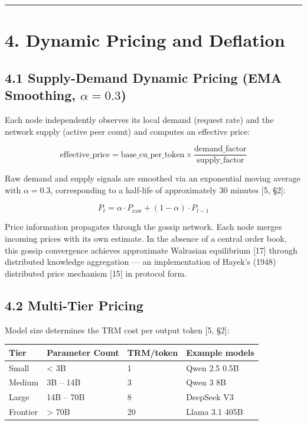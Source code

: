 \documentclass[
  11pt,
]{article}
\newcounter{none} %
\begin{document}
\begin{center}\rule{0.5\linewidth}{0.5pt}\end{center}

\section{4. Dynamic Pricing and
Deflation}\label{dynamic-pricing-and-deflation}

\subsection{\texorpdfstring{4.1 Supply-Demand Dynamic Pricing (EMA
Smoothing,
\(\alpha = 0.3\))}{4.1 Supply-Demand Dynamic Pricing (EMA Smoothing, \textbackslash alpha = 0.3)}}\label{supply-demand-dynamic-pricing-ema-smoothing-alpha-0.3}

Each node independently observes its local demand (request rate) and the
network supply (active peer count) and computes an effective price:

\[\text{effective\_price} = \text{base\_cu\_per\_token} \times \frac{\text{demand\_factor}}{\text{supply\_factor}}\]

Raw demand and supply signals are smoothed via an exponential moving
average with \(\alpha = 0.3\), corresponding to a half-life of
approximately 30 minutes {[}5, §2{]}:

\[P_t = \alpha \cdot P_{\text{raw}} + (1 - \alpha) \cdot P_{t-1}\]

Price information propagates through the gossip network. Each node
merges incoming prices with its own estimate. In the absence of a
central order book, this gossip convergence achieves approximate
Walrasian equilibrium {[}17{]} through distributed knowledge aggregation
--- an implementation of Hayek's (1948) distributed price mechanism
{[}15{]} in protocol form.

\subsection{4.2 Multi-Tier Pricing}\label{multi-tier-pricing}

Model size determines the TRM cost per output token {[}5, §2{]}:

{\def\LTcaptype{none} %
\begin{longtable}[]{@{}llll@{}}
\toprule\noalign{}
Tier & Parameter Count & TRM/token & Example models \\
\midrule\noalign{}
\endhead
\bottomrule\noalign{}
\endlastfoot
Small & \textless{} 3B & 1 & Qwen 2.5 0.5B \\
Medium & 3B -- 14B & 3 & Qwen 3 8B \\
Large & 14B -- 70B & 8 & DeepSeek V3 \\
Frontier & \textgreater{} 70B & 20 & Llama 3.1 405B \\
\end{longtable}
}
\end{document}
